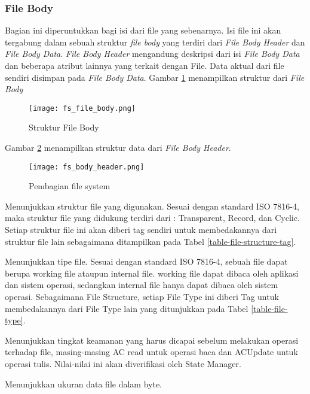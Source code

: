 \documentclass[a4paper, 12pt]{report}
\begin{document}
\subsubsection{File Body}
\label{file-body}

Bagian ini diperuntukkan bagi isi dari file yang sebenarnya. Isi file ini akan tergabung dalam sebuah struktur {\em file body} yang terdiri dari {\em File Body Header} dan {\em File Body Data}. {\em File Body Header} mengandung deskripsi dari isi {\em File Body Data} dan beberapa atribut lainnya yang terkait dengan File. Data aktual dari file sendiri disimpan pada {\em File Body Data}. Gambar \ref{fig-body} menampilkan struktur dari {\em File Body}

\begin{figure}[h]
  \centering
  \texttt{[image: fs\_file\_body.png]} 
  \caption{Struktur File Body}
  \label{fig-body}
\end{figure}


Gambar \ref{fig-body-header} menampilkan struktur data dari {\em File Body Header}.

\begin{figure}[h]
\centering
\texttt{[image: fs\_body\_header.png]}
\caption{Pembagian file system}
\label{fig-body-header}
\end{figure}


\begin{description}[leftmargin=3cm,style=sameline]

\item[Structure] Menunjukkan struktur file yang digunakan. Sesuai dengan standard ISO 7816-4, maka struktur file yang didukung terdiri dari : Transparent, Record, dan Cyclic. Setiap struktur file ini akan diberi tag sendiri untuk membedakannya dari struktur file lain sebagaimana ditampilkan pada Tabel \ref{table-file-structure-tag}.

\item[Type] Menunjukkan tipe file. Sesuai dengan standard ISO 7816-4, sebuah file dapat berupa working file ataupun internal file. working file dapat dibaca oleh aplikasi dan sistem operasi, sedangkan internal file hanya dapat dibaca oleh sistem operasi. Sebagaimana File Structure, setiap File Type ini diberi Tag untuk membedakannya dari File Type lain yang ditunjukkan pada Tabel \ref{table-file-type}.

\item[Access cond.] Menunjukkan tingkat keamanan yang harus dicapai sebelum melakukan operasi terhadap file, masing-masing AC read untuk operasi baca dan ACUpdate untuk operasi tulis. Nilai-nilai ini akan diverifikasi oleh State Manager.

\item[Size] Menunjukkan ukuran data file dalam byte. 

\end{description}
\end{document}
